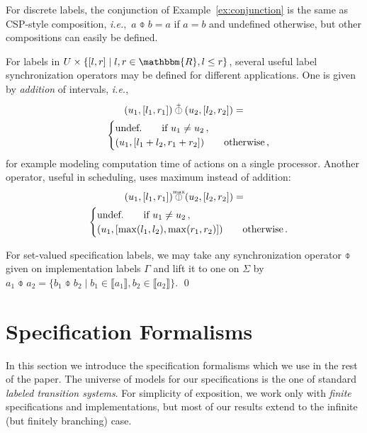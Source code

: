 \documentclass[twocolumn]{svjour3-dummy}
\newcommand*\ie{\textit{i.e.},}
\newcommand*\impl[1]{\llbracket #1\rrbracket}
\newcommand*\Real{\mathbbm{R}}
\newcommand*\obarplus{\mathbin{\overset{\scriptscriptstyle +}{\raisebox{0pt}[1.1ex][0pt]{$\obar$}}}}
\newcommand*\obarmax{\mathbin{\overset{\makebox[0pt]{$\scriptscriptstyle \text{max}$}}{\raisebox{0pt}[1.05ex][0pt]{$\obar$}}}}
\begin{document}
\begin{example}
  \label{ex:composition}
  For discrete labels, the conjunction of Example~\ref{ex:conjunction}
  is the same as CSP-style composition, \ie~$a\obar b= a$ if $a= b$ and
  undefined otherwise, but other compositions can easily be defined.

  For labels in $U\times\{[ l, r]\mid l, r\in \Real, l\le r\}$, several
  useful label synchronization operators may be defined for different
  applications.  One is given by \emph{addition} of intervals, \ie
  \begin{multline*}
    ( u_1,[ l_1, r_1])\obarplus( u_2,[ l_2, r_2])= \\ \qquad
    \begin{cases}
      \text{undef.} \qquad\text{if } u_1\ne u_2\,,\\
      ( u_1,[ l_1+ l_2, r_1+ r_2]) \qquad\text{otherwise}\,,
    \end{cases}
  \end{multline*}
  for example modeling computation time of actions on a single
  processor.  Another operator, useful in scheduling, uses maximum
  instead of addition:
  \begin{multline*}
    ( u_1,[ l_1, r_1])\obarmax( u_2,[ l_2, r_2])= \\ \qquad
    \begin{cases}
      \text{undef.} \qquad\text{if } u_1\ne u_2\,,\\
      ( u_1,[ \max( l_1, l_2), \max( r_1, r_2)])
      \qquad\text{otherwise}\,.
    \end{cases}
  \end{multline*}

  For set-valued specification labels, we may take any synchronization
  operator $\obar$ given on implementation labels $\Gamma$ and lift it
  to one on $\Sigma$ by $a_1\obar a_2=\{ b_1\obar b_2\mid b_1\in \impl{
    a_1}, b_2\in \impl{ a_2}\}$. \qed
\end{example}

\section{Specification Formalisms}
\label{se:formalisms}

In this section we introduce the specification formalisms which we use
in the rest of the paper.  The universe of models for our specifications
is the one of standard \emph{labeled transition systems}.  For
simplicity of exposition, we work only with \emph{finite} specifications
and implementations, but most of our results extend to the infinite (but
finitely branching) case.
\end{document}
